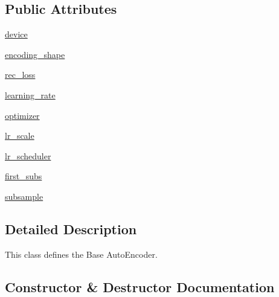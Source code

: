 \subsection*{Public Attributes}
\begin{DoxyCompactItemize}
\item 
\hyperlink{classtaxons_1_1core_1_1metrics_1_1ae_1_1_base_a_e_a0918ab6177121c975f5477529c228968}{device}
\item 
\hyperlink{classtaxons_1_1core_1_1metrics_1_1ae_1_1_base_a_e_aa6e5b2159906c08bafa87f84ba59be84}{encoding\+\_\+shape}
\item 
\hyperlink{classtaxons_1_1core_1_1metrics_1_1ae_1_1_base_a_e_a9d45729c6493139e5115b28eddb66ed5}{rec\+\_\+loss}
\item 
\hyperlink{classtaxons_1_1core_1_1metrics_1_1ae_1_1_base_a_e_a60c6445fef7c1ca698e195f877bfbba5}{learning\+\_\+rate}
\item 
\hyperlink{classtaxons_1_1core_1_1metrics_1_1ae_1_1_base_a_e_a1154e40d77f67804ef9388f42d5ae93e}{optimizer}
\item 
\hyperlink{classtaxons_1_1core_1_1metrics_1_1ae_1_1_base_a_e_a04b605a2cfadf2715f833bce1260f77c}{lr\+\_\+scale}
\item 
\hyperlink{classtaxons_1_1core_1_1metrics_1_1ae_1_1_base_a_e_aef24cf39552f3e7b7fbe5f0a30ff6744}{lr\+\_\+scheduler}
\item 
\hyperlink{classtaxons_1_1core_1_1metrics_1_1ae_1_1_base_a_e_a269a856ba1409d1b97011a622429b966}{first\+\_\+subs}
\item 
\hyperlink{classtaxons_1_1core_1_1metrics_1_1ae_1_1_base_a_e_a4e28d7ab4936d2196f94a4da394c9011}{subsample}
\end{DoxyCompactItemize}


\subsection{Detailed Description}
\begin{DoxyVerb}This class defines the Base AutoEncoder.
\end{DoxyVerb}
 

\subsection{Constructor \& Destructor Documentation}
